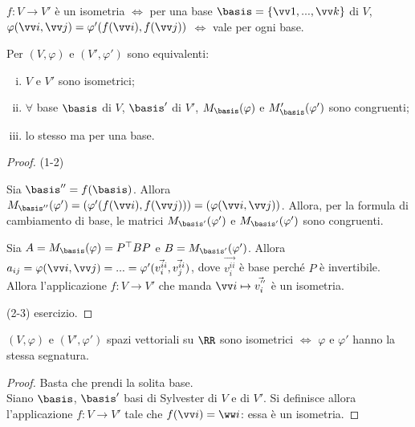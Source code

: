 \documentclass[11pt]{article}
\begin{document}
	\begin{exercise}\nl
		\li $f : V \to V'$ è un isometria $\iff$ per una base $\basis =
		\{\vv1, ..., \vv k\}$ di $V$, $\varphi(\vv i, \vv j) = \varphi'(f(\vv i), f(\vv j))$ $\iff$ vale per ogni base.
	\end{exercise}

	\begin{proposition}
		Per $(V, \varphi)$ e $(V', \varphi')$ sono equivalenti:
		
		\begin{enumerate}[(i)]
			\item $V$ e $V'$ sono isometrici;
			\item $\forall$ base $\basis$ di $V$, $\basis'$ di $V'$,
			$M_\basis(\varphi)$ e $M_\basis'(\varphi')$ sono congruenti;
			\item lo stesso ma per una base.
		\end{enumerate}
	\end{proposition}

	\begin{proof}
		(1-2)
		
		 \rightproof Sia $\basis'' = f(\basis)$. Allora $M_{\basis''}(\varphi')=
		 (\varphi'(f(\vv i), f(\vv j))) = (\varphi(\vv i, \vv j))$. Allora,
		 per la formula di cambiamento di base, le matrici
		 $M_{\basis'}(\varphi')$ e $M_{\basis'}(\varphi')$ sono congruenti.
		 
		 \leftproof Sia $A = M_\basis(\varphi) = P^\top B P$ e
		 $B = M_{\basis'}(\varphi')$. Allora $a_{ij} = \varphi(\vv i, \vv j) =
		 ... = \varphi'(\vec{v_i^{ii}}, \vec{v_j^{ii}})$, dove
		 $\vec{v_i^{ii}}$ è base perché $P$ è invertibile. Allora
		 l'applicazione $f : V \to V'$ che manda $\vv i \mapsto \vec{v_{i}^{''}}$ è un isometria.
		 
		 (2-3) esercizio.
	\end{proof}

	\begin{proposition} $(V, \varphi)$ e $(V', \varphi')$ spazi vettoriali
		su $\RR$ sono
		isometrici $\iff$ $\varphi$ e $\varphi'$ hanno la stessa segnatura.
	\end{proposition}

	\begin{proof}
		\rightproof Basta che prendi la solita base. \\
		\leftproof Siano $\basis$, $\basis'$ basi di Sylvester di $V$
		e di $V'$. Si definisce allora l'applicazione $f : V \to V'$ tale
		che $f(\vv i) = \ww i$: essa è un isometria.
	\end{proof}
\end{document}
